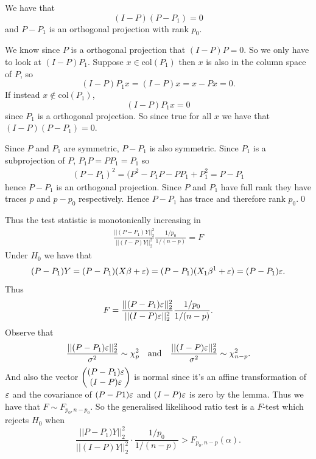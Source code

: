 \documentclass{article}
\begin{document}
\begin{lemma}
  We have that
  \[
	  (I-P)(P-P_1) = 0
  \]
and $ P-P_1 $ is an orthogonal projection with rank $ p_0 $.
\end{lemma}
\pf We know since $ P $ is a orthogonal projection that $ (I-P)P = 0 $. So we only have to look at $ (I-P)P_1 $. Suppose $ x\in \mathrm{col}(P_1) $ then $ x $ is also in the column space of $ P $, so
\[
	(I-P)P_1x = (I-P)x = x - Px = 0.
\]
If instead $ x\notin \mathrm{col}(P_1) $,
\[
	(I-P)P_1x = 0
\]
since $ P_1 $ is a orthogonal projection. So since true for all $ x $ we have that $ (I-P)(P-P_1) = 0 $.\par
Since $ P $ and $ P_1 $ are symmetric, $ P-P_1 $ is also symmetric. Since $ P_1 $ is a subprojection of $ P $, $ P_1P = PP_1 = P_1 $ so 
\begin{align*}
	(P-P_1)^2 = (P^2 - P_1P - PP_1 + P_1^2 = P - P_1
\end{align*}
hence $ P-P_1 $ is an orthogonal projection. Since $ P $ and $ P_1 $ have full rank they have traces $ p $ and $ p-p_0 $ respectively. Hence $ P-P_1 $ has trace and therefore rank $ p_0 $.\qed
\par
Thus the test statistic is monotonically increasing in
\begin{align*}
	\frac{||(P-P_1)Y||^2_2}{||(I-P)Y||^2_2} \frac{1/p_0}{1/(n-p)} = F
\end{align*}
Under $ H_0 $ we have that 
\[
(P-P_1)Y = (P-P_1)(X\beta + \varepsilon) = (P-P_1)(X_1\beta^1 + \varepsilon)= (P-P_1)\varepsilon.
\]
Thus
\[
	F = \frac{||(P-P_1)\varepsilon||^2_2}{||(I-P)\varepsilon||^2_2} \frac{1/p_0}{1/(n-p)}.
\]
Observe that
\[
	\frac{||(P-P_1)\varepsilon||^2_2}{\sigma^2} \sim \chi^2_p \quad \text{and}\quad \frac{||(I-P)\varepsilon||^2_2}{\sigma^2} \sim \chi^2_{n-p}.
\]
And also the vector $ \begin{pmatrix}
	(P-P_1 ) \varepsilon \\ (I-P)\varepsilon
\end{pmatrix} $ is normal since it's an affine transformation of $ \varepsilon $ and the covariance of $ (P-P1)\varepsilon $ and $ (I-P)\varepsilon $ is zero by the lemma. Thus we have that $ F\sim F_{p_0, n-p_0} $. So the generalised likelihood ratio test is a $ F $-test which rejects $ H_0 $ when
\[
	\frac{||P-P_1)Y||^2_2}{||(I-P)Y||_2^2} \cdot \frac{1/p_0}{1/(n-p)} > F_{p_0,n-p}(\alpha).
\]
\end{document}
